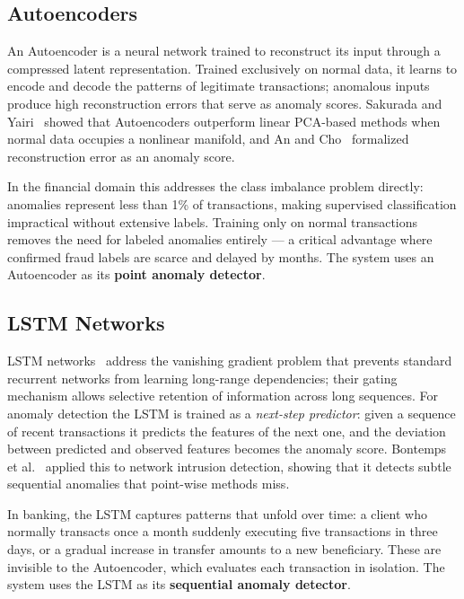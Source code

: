 \subsection{Autoencoders}

An Autoencoder is a neural network trained to reconstruct its input through a compressed latent representation. Trained exclusively on normal data, it learns to encode and decode the patterns of legitimate transactions; anomalous inputs produce high reconstruction errors that serve as anomaly scores. Sakurada and Yairi~\cite{sakurada} showed that Autoencoders outperform linear PCA-based methods when normal data occupies a nonlinear manifold, and An and Cho~\cite{ancho} formalized reconstruction error as an anomaly score.

In the financial domain this addresses the class imbalance problem directly: anomalies represent less than 1\% of transactions, making supervised classification impractical without extensive labels. Training only on normal transactions removes the need for labeled anomalies entirely --- a critical advantage where confirmed fraud labels are scarce and delayed by months. The system uses an Autoencoder as its \textbf{point anomaly detector}.

\subsection{LSTM Networks}

LSTM networks~\cite{lstm} address the vanishing gradient problem that prevents standard recurrent networks from learning long-range dependencies; their gating mechanism allows selective retention of information across long sequences. For anomaly detection the LSTM is trained as a \emph{next-step predictor}: given a sequence of recent transactions it predicts the features of the next one, and the deviation between predicted and observed features becomes the anomaly score. Bontemps et al.~\cite{bontemps} applied this to network intrusion detection, showing that it detects subtle sequential anomalies that point-wise methods miss.

In banking, the LSTM captures patterns that unfold over time: a client who normally transacts once a month suddenly executing five transactions in three days, or a gradual increase in transfer amounts to a new beneficiary. These are invisible to the Autoencoder, which evaluates each transaction in isolation. The system uses the LSTM as its \textbf{sequential anomaly detector}.

